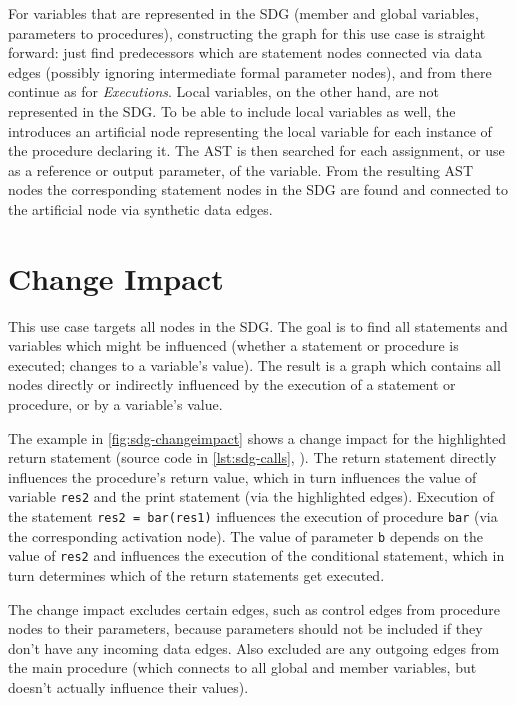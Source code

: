 For variables that are represented in the SDG (member and global variables, parameters to procedures), constructing the 
graph for this use case is straight forward: just find predecessors which are statement nodes connected via data edges 
(possibly ignoring intermediate formal parameter nodes), and from there continue as for \emph{Executions}. Local 
variables, on the other hand, are not represented in the SDG. To be able to include local variables as well, the \SB 
introduces an artificial node representing the local variable for each instance of the procedure declaring it. The AST 
is then searched for each assignment, or use as a reference or output parameter, of the variable. From the resulting 
AST nodes the corresponding statement nodes in the SDG are found and connected to the artificial node via synthetic 
data edges.


\section{Change Impact}

This use case targets all nodes in the SDG. The goal is to find all statements and variables which might be influenced 
(whether a statement or procedure is executed; changes to a variable's value). The result is a graph which contains all 
nodes directly or indirectly influenced by the execution of a statement or procedure, or by a variable's value.

The example in \autoref{fig:sdg-changeimpact} shows a change impact for the highlighted return statement (source code 
in \autoref{lst:sdg-calls}, ). The return statement directly influences the procedure's 
return value, which in turn influences the value of variable \lstinline|res2| and the print statement (via the 
highlighted edges). Execution of the statement \lstinline|res2 = bar(res1)| influences the execution of procedure 
\lstinline|bar| (via the corresponding activation node). The value of parameter \lstinline|b| depends on the value of 
\lstinline|res2| and influences the execution of the conditional statement, which in turn determines which of the 
return statements get executed.

The change impact excludes certain edges, such as control edges from procedure nodes to their parameters, because 
parameters should not be included if they don't have any incoming data edges. Also excluded are any outgoing edges from 
the main procedure (which connects to all global and member variables, but doesn't actually influence their values).

